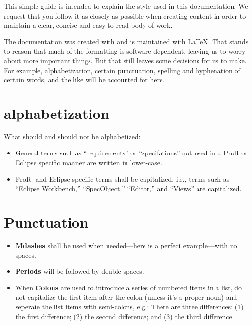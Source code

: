 This simple guide is intended to explain the style used in this documentation.  We request that you follow it as closely as possible when creating content in order to maintain a clear, concise and easy to read body of work.

The documentation was created with and is maintained with \LaTeX.  That stands to reason that much of the formatting is software-dependent, leaving us to worry about more important things.  But that still leaves some decisions for us to make.  For example, alphabetization, certain punctuation, spelling and hyphenation of certain words, and the like will be accounted for here.


\section{alphabetization}

What should and should not be alphabetized:

\begin{itemize}

\item
  General terms such as ``requirements'' or ``specifations'' not used in a ProR or Eclipse specific manner are written in lower-case.
\item
  ProR- and Eclipse-specific terms shall be capitalized. i.e., terms such as ``Eclipse Workbench,'' ``SpecObject,'' ``Editor,'' and ``Views'' are capitalized.

\end{itemize}

\section{Punctuation}

\begin{itemize}

\item
  \textbf{Mdashes} shall be used when needed—here is a perfect example—with no spaces. 
\item
  \textbf{Periods} will be followed by double-spaces.
\item
  When \textbf{Colons} are used to introduce a series of numbered items in a list, do not capitalize the first item after the colon (unless it's a proper noun) and seperate the list items with semi-colons, e.g.:
  There are three differences: (1) the first difference; (2) the second difference; and (3) the third difference.
  
\end{itemize}


